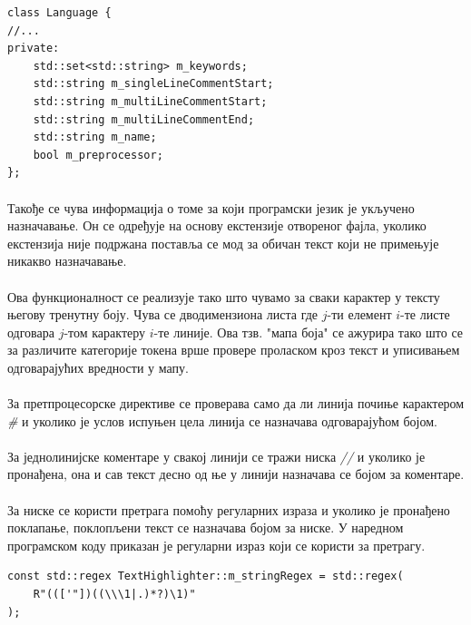 \documentclass[12pt,oneside]{memoir}
\begin{document}
\begin{verbatim}
class Language {
//...
private:
	std::set<std::string> m_keywords;
	std::string m_singleLineCommentStart;
	std::string m_multiLineCommentStart;
	std::string m_multiLineCommentEnd;
	std::string m_name;
	bool m_preprocessor;
};
\end{verbatim}

\paragraph{}
Такође се чува информација о томе за који програмски језик је укључено
назначавање. Он се одређује на основу екстензије отвореног фајла, уколико
екстензија није подржана поставља се мод за обичан текст који не примењује
никакво назначавање.

\paragraph{}
Ова функционалност се реализује тако што чувамо за сваки карактер у тексту његову тренутну боју. Чува се дводимензиона листа где \(j\)-ти елемент \(i\)-те
листе одговара \(j\)-том карактеру \(i\)-те линије. Ова тзв. "мапа боја" се
ажурира тако што се за различите категорије токена врше провере проласком
кроз текст и уписивањем одговарајућих вредности у мапу.

\paragraph{}
За претпроцесорске директиве се проверава само да ли линија почиње карактером
\textit{\#} и уколико је услов испуњен цела линија се назначава одговарајућом бојом.

\paragraph{}
За једнолинијске коментаре у свакој линији се тражи ниска \textit{//} и уколико
је пронађена, она и сав текст десно од ње у линији назначава се бојом за
коментаре.

\paragraph{}
За ниске се користи претрага помоћу регуларних израза и уколико је пронађено
поклапање, поклопљени текст се назначава бојом за ниске. У наредном програмском
коду приказан је регуларни израз који се користи за претрагу.

\begin{verbatim}
const std::regex TextHighlighter::m_stringRegex = std::regex(
	R"((['"])((\\\1|.)*?)\1)"
);
\end{verbatim}
\end{document}
